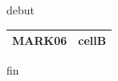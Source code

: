 \documentclass[11pt,a4paper]{article}
\begin{document}
debut

\begin{table}[h]
\begin{tabular}{|l|l|}
\hline
MARK06 & cellB \\ \hline
\end{tabular}
\end{table}

fin
\end{document}
